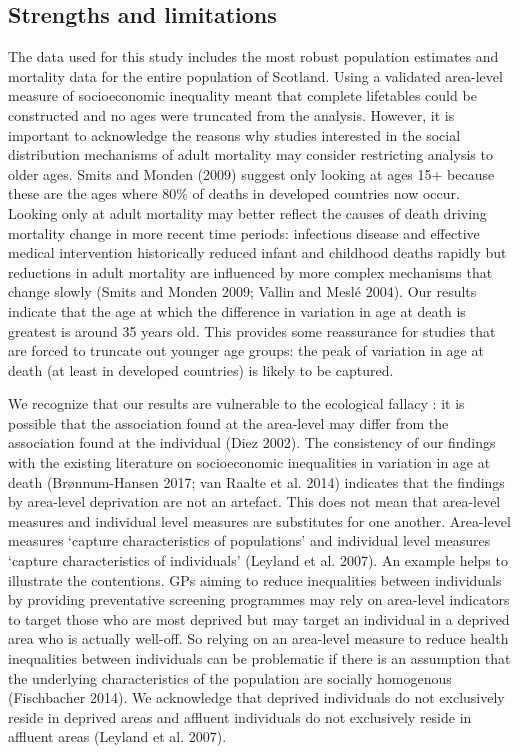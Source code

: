\documentclass[12pt,oneside,a4paper]{article} %
\theoremstyle{definition}
\begin{document}
\subsection{Strengths and limitations}
The data used for this study includes the most robust population estimates and mortality data for the entire population of Scotland. Using a validated area-level measure of socioeconomic inequality meant that complete lifetables could be constructed and no ages were truncated from the analysis. However, it is important to acknowledge the reasons why studies interested in the social distribution mechanisms of adult mortality may consider restricting analysis to older ages. Smits and Monden (2009) suggest only looking at ages 15+ because these are the ages where 80\% of deaths in developed countries now occur. Looking only at adult mortality may better reflect the causes of death driving mortality change in more recent time periods: infectious disease and effective medical intervention historically reduced infant and childhood deaths rapidly but reductions in adult mortality are influenced by more complex mechanisms that change slowly (Smits and Monden 2009; Vallin and Meslé 2004). Our results indicate that the age at which the difference in variation in age at death is greatest is around 35 years old. This provides some reassurance for studies that are forced to truncate out younger age groups: the peak of variation in age at death (at least in developed countries) is likely to be captured. 

We recognize that our results are vulnerable to the ecological fallacy : it is possible that the association found at the area-level may differ from the association found at the individual (Diez 2002). The consistency of our findings with the existing literature on socioeconomic inequalities in variation in age at death (Brønnum-Hansen 2017; van Raalte et al. 2014) indicates that the findings by area-level deprivation are not an artefact. This does not mean that area-level measures and individual level measures are substitutes for one another. Area-level measures ‘capture characteristics of populations’ and individual level measures ‘capture characteristics of individuals’ (Leyland et al. 2007). An example helps to illustrate the contentions. GPs aiming to reduce inequalities between individuals by providing preventative screening programmes may rely on area-level indicators to target those who are most deprived but may target an individual in a deprived area who is actually well-off. So relying on an area-level measure to reduce health inequalities between individuals can be problematic if there is an assumption that the underlying characteristics of the population are socially homogenous (Fischbacher 2014). We acknowledge that deprived individuals do not exclusively reside in deprived areas and affluent individuals do not exclusively reside in affluent areas (Leyland et al. 2007).
\end{document}
